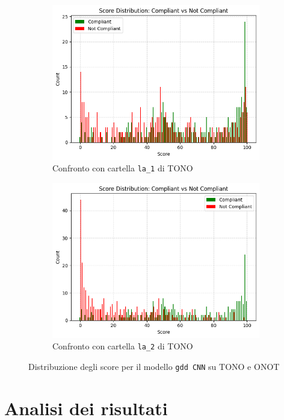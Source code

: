 \documentclass[12pt,a4paper,openright,twoside]{book}
\begin{document}
\begin{figure}[htbp]
    \centering
    \begin{subfigure}{0.49\textwidth}
        \centering
        \includegraphics[width=.7\linewidth]{figures/score-distribution-frontal-gaze-gdd-v3-la1.png}
        \caption{Confronto con cartella \texttt{la\_1} di TONO}
        \label{fig:score_distribution_frontal_gaze_gdd_v3_la1}
    \end{subfigure}
    \hfill
    \begin{subfigure}{0.49\textwidth}
        \centering
        \includegraphics[width=.7\linewidth]{figures/score-distribution-frontal-gaze-gdd-v3-la2.png}
        \caption{Confronto con cartella \texttt{la\_2} di TONO}
        \label{fig:score_distribution_frontal_gaze_gdd_v3_la2}
    \end{subfigure}
    \caption{Distribuzione degli score per il modello \texttt{gdd CNN} su TONO e ONOT}
\end{figure}


\chapter{Analisi dei risultati}
\end{document}
